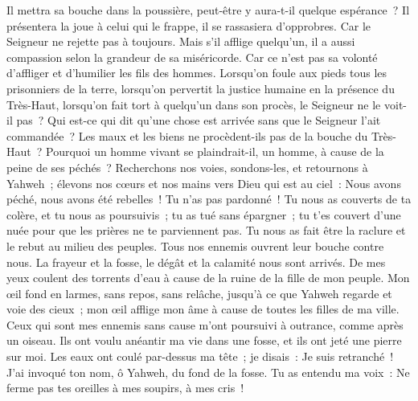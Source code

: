 \begin{multicols}{2}
Il mettra sa bouche dans la poussière, peut-être y aura-t-il quelque espérance~?
Il présentera la joue à celui qui le frappe, il se rassasiera d'opprobres.
 Car le Seigneur ne rejette pas à toujours.
Mais s'il afflige quelqu'un, il a aussi compassion selon la grandeur de sa miséricorde.
Car ce n'est pas sa volonté d'affliger et d'humilier les fils des hommes.
 Lorsqu'on foule aux pieds tous les prisonniers de la terre,
lorsqu'on pervertit la justice humaine en la présence du Très-Haut,
lorsqu'on fait tort à quelqu'un dans son procès, le Seigneur ne le voit-il pas~?
 Qui est-ce qui dit qu'une chose est arrivée sans que le Seigneur l'ait commandée~?
Les maux et les biens ne procèdent-ils pas de la bouche du Très-Haut~?
Pourquoi un homme vivant se plaindrait-il, un homme, à cause de la peine de ses péchés~?
 Recherchons nos voies, sondons-les, et retournons à Yahweh~;
élevons nos cœurs et nos mains vers Dieu qui est au ciel~:
Nous avons péché, nous avons été rebelles~! Tu n'as pas pardonné~!
 Tu nous as couverts de ta colère, et tu nous as poursuivis~; tu as tué sans épargner~;
tu t'es couvert d'une nuée pour que les prières ne te parviennent pas.
Tu nous as fait être la raclure et le rebut au milieu des peuples.
 Tous nos ennemis ouvrent leur bouche contre nous.
La frayeur et la fosse, le dégât et la calamité nous sont arrivés.
De mes yeux coulent des torrents d'eau à cause de la ruine de la fille de mon peuple.
 Mon œil fond en larmes, sans repos, sans relâche,
jusqu'à ce que Yahweh regarde et voie des cieux~;
mon œil afflige mon âme à cause de toutes les filles de ma ville.
 Ceux qui sont mes ennemis sans cause m'ont poursuivi à outrance, comme après un oiseau.
Ils ont voulu anéantir ma vie dans une fosse, et ils ont jeté une pierre sur moi.
Les eaux ont coulé par-dessus ma tête~; je disais~: Je suis retranché~!
 J'ai invoqué ton nom, ô Yahweh, du fond de la fosse.
Tu as entendu ma voix~: Ne ferme pas tes oreilles à mes soupirs, à mes cris~!

\end{multicols}
